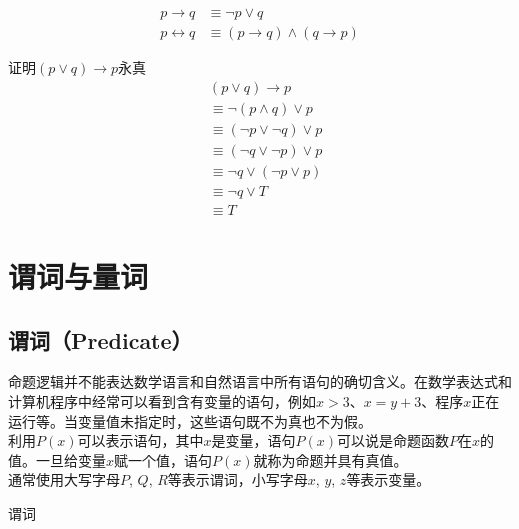 \documentclass[12pt, openany, oneside]{book}
\begin{document}
\begin{tcolorbox}
	\begin{align}
		p \rightarrow q     & \equiv \neg p \vee q                              \\
		p \leftrightarrow q & \equiv (p \rightarrow q) \wedge (q \rightarrow p)
	\end{align}
\end{tcolorbox}

\begin{tcolorbox}\nonumber
	证明$ (p \vee q) \rightarrow p $永真
	\begin{align}
		 & (p \vee q) \rightarrow p           \\
		 & \equiv \neg (p \wedge q) \vee p    \\
		 & \equiv (\neg p \vee \neg q) \vee p \\
		 & \equiv (\neg q \vee \neg p) \vee p \\
		 & \equiv \neg q \vee (\neg p \vee p) \\
		 & \equiv \neg q \vee T               \\
		 & \equiv T
	\end{align}
\end{tcolorbox}

\newpage

\section{谓词与量词}

\subsection{谓词（Predicate）}

命题逻辑并不能表达数学语言和自然语言中所有语句的确切含义。在数学表达式和计算机程序中经常可以看到含有变量的语句，例如$ x > 3 $、$ x = y + 3 $、程序$ x $正在运行等。当变量值未指定时，这些语句既不为真也不为假。 \\

利用$ P(x) $可以表示语句，其中$ x $是变量，语句$ P(x) $可以说是命题函数$ P $在$ x $的值。一旦给变量$ x $赋一个值，语句$ P(x) $就称为命题并具有真值。 \\

通常使用大写字母$ P $, $ Q $, $ R $等表示谓词，小写字母$ x $, $ y $, $ z $等表示变量。

\begin{tcolorbox}
	谓词
	\begin{table}[H]
		\centering
	\end{table}
\end{tcolorbox}
\end{document}
